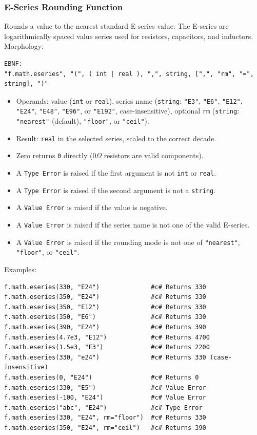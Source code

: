 \subsubsection{E-Series Rounding Function}
Rounds a value to the nearest standard E-series value. The E-series are logarithmically spaced value series used for resistors, capacitors, and inductors. \\
Morphology:
\begin{verbatim}
EBNF:
"f.math.eseries", "(", ( int | real ), ",", string, [",", "rm", "=", string], ")"
\end{verbatim}
\begin{itemize}
\item Operands: value (\texttt{int} or \texttt{real}), series name (\texttt{string}: \texttt{"E3"}, \texttt{"E6"}, \texttt{"E12"}, \texttt{"E24"}, \texttt{"E48"}, \texttt{"E96"}, or \texttt{"E192"}, case-insensitive), optional \texttt{rm} (\texttt{string}: \texttt{"nearest"} (default), \texttt{"floor"}, or \texttt{"ceil"}).
\item Result: \texttt{real} in the selected series, scaled to the correct decade.
\item Zero returns \texttt{0} directly ($0\Omega$ resistors are valid components).
\item A \texttt{Type Error} is raised if the first argument is not \texttt{int} or \texttt{real}.
\item A \texttt{Type Error} is raised if the second argument is not a \texttt{string}.
\item A \texttt{Value Error} is raised if the value is negative.
\item A \texttt{Value Error} is raised if the series name is not one of the valid E-series.
\item A \texttt{Value Error} is raised if the rounding mode is not one of \texttt{"nearest"}, \texttt{"floor"}, or \texttt{"ceil"}.
\end{itemize}
Examples:
\begin{verbatim}
f.math.eseries(330, "E24")              #c# Returns 330
f.math.eseries(350, "E24")              #c# Returns 330
f.math.eseries(350, "E12")              #c# Returns 330
f.math.eseries(350, "E6")               #c# Returns 330
f.math.eseries(390, "E24")              #c# Returns 390
f.math.eseries(4.7e3, "E12")            #c# Returns 4700
f.math.eseries(1.5e3, "E3")             #c# Returns 2200
f.math.eseries(330, "e24")              #c# Returns 330 (case-insensitive)
f.math.eseries(0, "E24")                #c# Returns 0
f.math.eseries(330, "E5")               #c# Value Error
f.math.eseries(-100, "E24")             #c# Value Error
f.math.eseries("abc", "E24")            #c# Type Error
f.math.eseries(330, "E24", rm="floor")  #c# Returns 330
f.math.eseries(350, "E24", rm="ceil")   #c# Returns 390
\end{verbatim}

